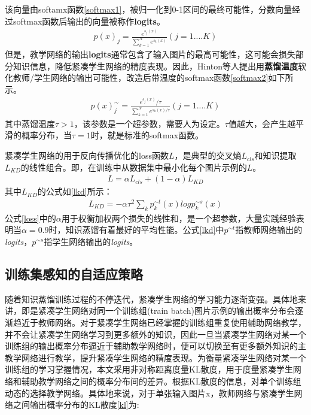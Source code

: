 该向量由softamx函数\ref{softmax1}，被归一化到0-1区间的最终可能性，分数向量经过softmax函数后输出的向量被称作\textbf{logits}。
\begin{equation}
\begin{aligned}
\label{softmax1}
p(x)_j = \frac{e^{s_j(x)}}{\sum_{k=1}^N e^{s_k(x)}}  (j=1....K)
\end{aligned}
\end{equation}
但是，教学网络的输出\textbf{logits}通常包含了输入图片的最高可能性，这可能会损失部分知识信息，降低紧凑学生网络的精度表现。因此，Hinton等人\cite{hinton2015distilling}提出用\textbf{蒸馏温度}软化教师/学生网络的输出可能性，改造后带温度的softmax函数\ref{softmax2}如下所示。
\begin{equation}
\begin{aligned}
\label{softmax2}
p(x)^{\sim}_j = \frac{e^{s_j(x)}/\tau}{\sum_{k=1}^N e^{s_k(x)/\tau}}  (j=1....K)
\end{aligned}
\end{equation}
其中蒸馏温度$\tau>1$，该参数是一个超参数，需要人为设定。$\tau$值越大，会产生越平滑的概率分布，当$\tau=1$时，就是标准的softmax函数。

紧凑学生网络的用于反向传播优化的loss函数$L$，是典型的交叉熵$L_{cls}$和知识提取$L_{KD}$的线性组合。即，在训练中从数据集中最小化每个图片示例的$L$。
\begin{equation}
\begin{aligned}
\label{loss}
L = \alpha L_{cls} + (1 - \alpha)L_{KD}
\end{aligned}
\end{equation}
其中$L_{KD}$的公式如\ref{lkd}所示：
\begin{equation}
\begin{aligned}
\label{lkd}
L_{KD} = -\alpha \tau^2 \sum_{k}p^{\sim t}_{k}(x)logp^{\sim s}_{k}(x)
\end{aligned}
\end{equation}
公式\ref{loss}中的$\alpha$用于权衡加权两个损失的线性和，是一个超参数，大量实践经验\cite{zagoruyko2016paying,huang2017like,lan2018knowledge,hinton2015distilling}表明当$\alpha=0.9$时，知识蒸馏有着最好的平均性能。公式\ref{lkd}中$p^{\sim t}$指教师网络输出的\emph{logits}，$p^{\sim s}$指学生网络输出的\emph{logits}。



\subsection{训练集感知的自适应策略}
随着知识蒸馏训练过程的不停迭代，紧凑学生网络的学习能力逐渐变强。具体地来讲，即是紧凑学生网络对同一个训练组(train batch)图片示例的输出概率分布会逐渐趋近于教师网络。对于紧凑学生网络已经掌握的训练组重复使用辅助网络教学，并不会让紧凑学生网络学习到更多额外的知识，因此一旦当紧凑学生网络对某一个训练组的输出概率分布逼近于辅助教学网络时，便可以切换至有更多额外知识的主教学网络进行教学，提升紧凑学生网络的精度表现。为衡量紧凑学生网络对某一个训练组的学习掌握情况，本文采用非对称距离度量KL散度，用于度量紧凑学生网络和辅助教学网络之间的概率分布间的差异。根据KL散度的信息，对单个训练组动态的选择教学网络。具体地来说，对于单张输入图片x，教师网络与紧凑学生网络之间输出概率分布的KL散度\ref{kl}为:

